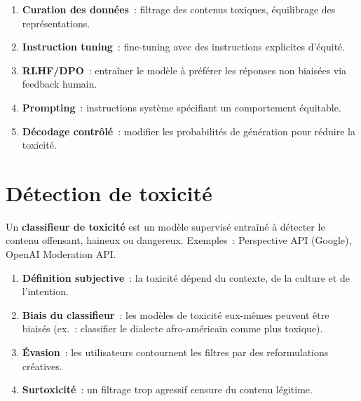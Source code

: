 \begin{definition}
\begin{enumerate}
    \item \textbf{Curation des donn\'ees}~: filtrage des contenus
    toxiques, \'equilibrage des repr\'esentations.
    \item \textbf{Instruction tuning}~: fine-tuning avec des instructions
    explicites d'\'equit\'e.
    \item \textbf{RLHF/DPO}~: entra\^iner le mod\`ele \`a pr\'ef\'erer
    les r\'eponses non biais\'ees via feedback humain.
    \item \textbf{Prompting}~: instructions syst\`eme sp\'ecifiant un
    comportement \'equitable.
    \item \textbf{D\'ecodage contr\^ol\'e}~: modifier les probabilit\'es
    de g\'en\'eration pour r\'eduire la toxicit\'e.
\end{enumerate}
\end{definition}

\section{D\'etection de toxicit\'e}
\label{sec:ethique:toxicite}

\begin{definition}
Un \textbf{classifieur de toxicit\'e} est un mod\`ele supervis\'e
entra\^in\'e \`a d\'etecter le contenu offensant, haineux ou dangereux.
Exemples~: Perspective API (Google), OpenAI Moderation API.
\end{definition}

\begin{proposition}
\begin{enumerate}
    \item \textbf{D\'efinition subjective}~: la toxicit\'e d\'epend du
    contexte, de la culture et de l'intention.
    \item \textbf{Biais du classifieur}~: les mod\`eles de toxicit\'e
    eux-m\^emes peuvent \^etre biais\'es (ex.~: classifier le dialecte
    afro-am\'ericain comme plus toxique).
    \item \textbf{\'Evasion}~: les utilisateurs contournent les filtres
    par des reformulations cr\'eatives.
    \item \textbf{Surtoxicit\'e}~: un filtrage trop agressif censure du
    contenu l\'egitime.
\end{enumerate}
\end{proposition}

